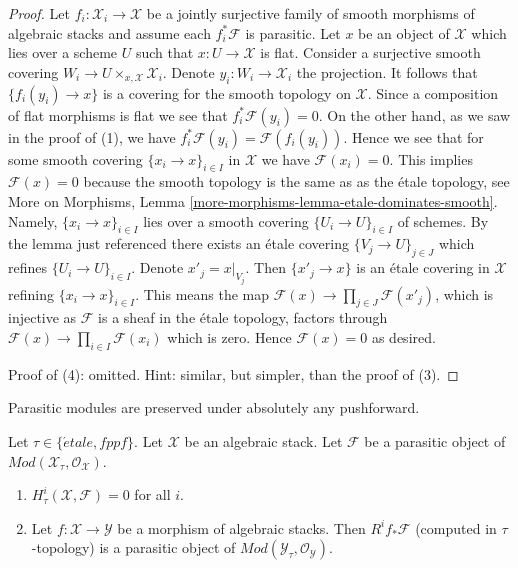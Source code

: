 \begin{proof}
\medskip\noindent
Let $f_i : \mathcal{X}_i \to \mathcal{X}$ be a jointly surjective family of
smooth morphisms of algebraic stacks and assume each $f_i^*\mathcal{F}$
is parasitic. Let $x$ be an object of $\mathcal{X}$ which lies over a
scheme $U$ such that $x : U \to \mathcal{X}$ is flat. Consider a surjective
smooth covering $W_i \to U \times_{x, \mathcal{X}} \mathcal{X}_i$.
Denote $y_i : W_i \to \mathcal{X}_i$ the projection. It follows
that $\{f_i(y_i) \to x\}$ is a covering for the smooth topology
on $\mathcal{X}$. Since a composition of flat morphisms is flat we see that
$f_i^*\mathcal{F}(y_i) = 0$. On the other hand, as we saw in the proof
of (1), we have $f_i^*\mathcal{F}(y_i) = \mathcal{F}(f_i(y_i))$.
Hence we see that for some smooth covering $\{x_i \to x\}_{i \in I}$
in $\mathcal{X}$ we have $\mathcal{F}(x_i) = 0$. This implies
$\mathcal{F}(x) = 0$ because the smooth topology is the same as
as the \'etale topology, see
More on Morphisms, Lemma \ref{more-morphisms-lemma-etale-dominates-smooth}.
Namely, $\{x_i \to x\}_{i \in I}$ lies over a smooth covering
$\{U_i \to U\}_{i \in I}$ of schemes. By the lemma just referenced
there exists an \'etale covering $\{V_j \to U\}_{j \in J}$ which
refines $\{U_i \to U\}_{i \in I}$. Denote $x'_j = x|_{V_j}$.
Then $\{x'_j \to x\}$ is an \'etale covering in $\mathcal{X}$
refining $\{x_i \to x\}_{i \in I}$. This means the map
$\mathcal{F}(x) \to \prod_{j \in J} \mathcal{F}(x'_j)$, which is
injective as $\mathcal{F}$ is a sheaf in the \'etale topology,
factors through $\mathcal{F}(x) \to \prod_{i \in I} \mathcal{F}(x_i)$
which is zero. Hence $\mathcal{F}(x) = 0$ as desired.

\medskip\noindent
Proof of (4): omitted. Hint: similar, but simpler, than the proof of (3).
\end{proof}

\medskip\noindent
Parasitic modules are preserved under absolutely any pushforward.

\begin{lemma}
\label{lemma-pushforward-parasitic}
Let $\tau \in \{\acute{e}tale, fppf\}$.
Let $\mathcal{X}$ be an algebraic stack.
Let $\mathcal{F}$ be a parasitic object of
$\textit{Mod}(\mathcal{X}_\tau, \mathcal{O}_\mathcal{X})$.
\begin{enumerate}
\item $H^i_\tau(\mathcal{X}, \mathcal{F}) = 0$ for all $i$.
\item Let $f : \mathcal{X} \to \mathcal{Y}$ be a morphism of algebraic stacks.
Then $R^if_*\mathcal{F}$ (computed in $\tau$-topology) is a
parasitic object of $\textit{Mod}(\mathcal{Y}_\tau, \mathcal{O}_\mathcal{Y})$.
\end{enumerate}
\end{lemma}

